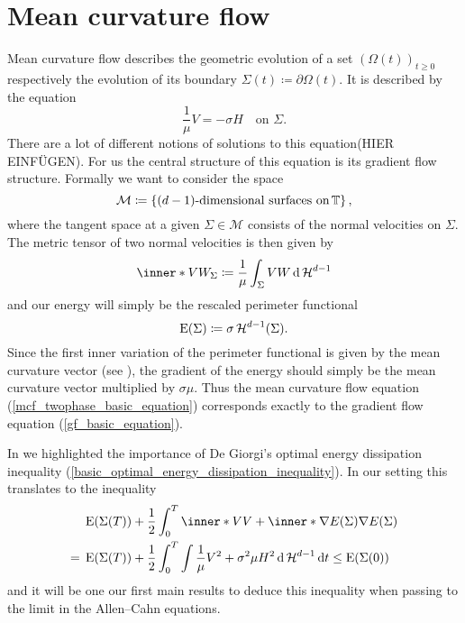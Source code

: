 \section{Mean curvature flow}
	\label{section_mcf}

Mean curvature flow describes the geometric evolution of a set $ ( \Omega ( t ) )_{ t \geq 0 } $ respectively the evolution of its boundary $ \Sigma ( t ) \coloneqq \partial \Omega ( t ) $. It is described by the equation
\begin{equation}
	\label{mcf_twophase_basic_equation}
	\frac{ 1 }{ \mu } V = - \sigma H 
	\quad
	\text{on }
	\Sigma.
\end{equation}
There are a lot of different notions of solutions to this equation(HIER EINFÜGEN).
For us the central structure of this equation is its gradient flow structure. Formally we want to consider the space
\begin{equation*}
	\mathcal{ M }
	\coloneqq
	\left\{
		(d-1) \text{-dimensional surfaces on} \operatorname{\mathbb{T}}
	\right\},
\end{equation*}
where the tangent space at a given $ \Sigma \in \mathcal{ M } $ consists of the normal velocities on $ \Sigma $.
The metric tensor of two normal velocities is then given by
\begin{equation*}
	\inner*{ V }{ W }_{ \Sigma }
	\coloneqq
	\frac{ 1 }{ \mu }
	\int_{ \Sigma }
		V W
	\dd{ \hm^{ d - 1 } }
\end{equation*}
and our energy will simply be the rescaled perimeter functional
\begin{equation*}
	\operatorname{E} ( \Sigma )
	\coloneqq
	\sigma \operatorname{\mathcal{H}}^{ d -1 } ( \Sigma ).
\end{equation*}
Since the first inner variation of the perimeter functional is given by the mean curvature vector (see \cite[Thm.~17.5]{maggi_sets_of_finite_perimeter}), the gradient of the energy should simply be the mean curvature vector multiplied by $ \sigma \mu $.
Thus the mean curvature flow equation (\ref{mcf_twophase_basic_equation}) corresponds exactly to the gradient flow equation (\ref{gf_basic_equation}).

In  we highlighted the importance of
De Giorgi's optimal energy dissipation inequality (\ref{basic_optimal_energy_dissipation_inequality}). In our setting  this translates to the inequality
\begin{align*}
	& \energy ( \Sigma ( T ) )
	+
	\frac{ 1 }{ 2 }
	\int_{ 0 }^{ T }
		\inner*{ V}{ V }
		+
		\inner*{ \nabla E ( \Sigma ) }{ \nabla E ( \Sigma ) }
	\\
	={}
	&\energy ( \Sigma ( T ) )
	+
	\frac{ 1 }{ 2 }
	\int_{ 0 }^{ T }
		\int
			\frac{ 1 }{ \mu }
			V^{ 2 } 
			+
			\sigma^{ 2 } \mu 
			H^{ 2 }
		\dd{ \hm^{ d - 1 } }
	\dd{ t }
	\leq
	\energy ( \Sigma ( 0 ) )
\end{align*}
and it will be one our first main results to deduce this inequality when passing to the limit in the Allen--Cahn equations.

